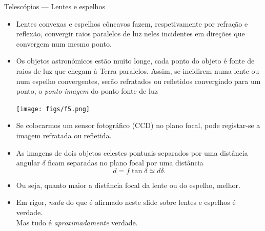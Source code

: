 \documentclass[beamer,9pt,aspectratio=169]{beamer}
\begin{document}
\begin{frame}{Telescópios --- Lentes e espelhos}
  \begin{itemize}
    \item
      Lentes convexas e espelhos côncavos fazem, respetivamente por refração e
      reflexão, convergir raios paralelos de luz neles incidentes em direções
      que convergem num mesmo ponto.
    \item Os objetos astronómicos estão muito longe, cada ponto do objeto é
      fonte de raios de luz que chegam à Terra paralelos. Assim, se incidirem numa
      lente ou num espelho convergentes, serão refratados ou refletidos
      convergindo para um ponto, o \emph{ponto imagem} do ponto fonte de luz
      \begin{center}
        \texttt{[image: figs/f5.png]}
      \end{center}
    \item Se colocarmos um sensor fotográfico (CCD) no plano focal, pode
      registar-se a imagem refratada ou refletida.
    \item
      As imagens de dois objetos celestes pontuais separados por uma distância
      angular $\delta$ ficam separadas no plano focal por uma distância
      \begin{equation*}
        d=f\tan\delta\simeq d\delta.
      \end{equation*}
    \item Ou seja, quanto maior a distância focal da lente ou do espelho,
      melhor.
      \vspace{0.85em}
    \item
      {\color{gray}
        Em rigor, \emph{nada} do que é afirmado neste slide sobre lentes e
        espelhos é verdade.\\
        \hspace{6cm}Mas tudo é \emph{aproximadamente} verdade.
    }
  \end{itemize}
\end{frame}
\end{document}
